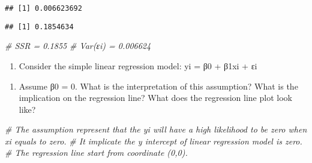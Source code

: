 \documentclass[
]{article}
\newenvironment{Shaded}{\begin{snugshade}}{\end{snugshade}}
\newcommand{\CommentTok}[1]{\textcolor[rgb]{0.56,0.35,0.01}{\textit{#1}}}
\newcommand{\DecValTok}[1]{\textcolor[rgb]{0.00,0.00,0.81}{#1}}
\newcommand{\FunctionTok}[1]{\textcolor[rgb]{0.00,0.00,0.00}{#1}}
\newcommand{\NormalTok}[1]{#1}
\newcommand{\OtherTok}[1]{\textcolor[rgb]{0.56,0.35,0.01}{#1}}
\newcommand{\SpecialCharTok}[1]{\textcolor[rgb]{0.00,0.00,0.00}{#1}}
\providecommand{\tightlist}{%
  \setlength{\itemsep}{0pt}\setlength{\parskip}{0pt}}
\begin{document}
\begin{Shaded}
\end{Shaded}

\begin{verbatim}
## [1] 0.006623692
\end{verbatim}

\begin{Shaded}
\end{Shaded}

\begin{verbatim}
## [1] 0.1854634
\end{verbatim}

\begin{Shaded}
\begin{Highlighting}[]
\CommentTok{\# SSR = 0.1855}
\CommentTok{\# Var(εi) = 0.006624}
\end{Highlighting}
\end{Shaded}

\begin{enumerate}
\def\labelenumi{\arabic{enumi}.}
\setcounter{enumi}{1}
\tightlist
\item
  Consider the simple linear regression model: yi = β0 + β1xi + εi
\end{enumerate}

\begin{enumerate}
\def\labelenumi{(\alph{enumi})}
\tightlist
\item
  Assume β0 = 0. What is the interpretation of this assumption? What is
  the implication on the regression line? What does the regression line
  plot look like?
\end{enumerate}

\begin{Shaded}
\begin{Highlighting}[]
\CommentTok{\# The assumption represent that the yi will have a high likelihood to be zero when xi equals to zero. }
\CommentTok{\# It implicate the y intercept of linear regression model is zero. }
\CommentTok{\# The regression line start from coordinate (0,0).}
\end{Highlighting}
\end{Shaded}
\end{document}
